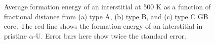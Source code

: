 \documentclass[review]{elsarticle}
\begin{document}
\begin{figure}[h!]
\centering
{}
\caption{Average formation energy of an interstitial at 500 K as a function of fractional distance from (a) type A, (b) type B, and (c) type C GB core. The red line shows the formation energy of an interstitial in pristine $\alpha$-U. Error bars here show twice the standard error.}
\label{fig:Seg_inter_500}
\end{figure}
\end{document}
